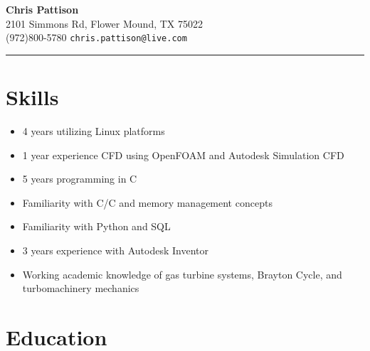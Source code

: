 \documentclass[11pt, letterpaper]{article}
\newcommand{\csharp}[0]{C\raisebox{.11em}{\footnotesize{\textbf{\#}}}}
\newcommand{\cpp}[0]{C\raisebox{.12em}{\footnotesize{\textbf{+\hspace{-.11em}+}}}}
\begin{document}
\begin{center}
\vspace{-2cm} \huge\textbf{Chris Pattison}\large\\
2101 Simmons Rd, Flower Mound, TX 75022\\
(972)800-5780 \textbf{\textbar} \texttt{chris.pattison@live.com}\normalsize

\rule{\textwidth}{1.5pt}\vspace{-1.2em}
\end{center}
\section*{Skills}
\begin{itemize}
\item 4 years utilizing Linux platforms
\item 1 year experience CFD using OpenFOAM and Autodesk Simulation CFD
\item 5 years programming in \csharp
\item Familiarity with C/\cpp{} and memory management concepts
\item Familiarity with Python and SQL
\item 3 years experience with Autodesk Inventor
\item Working academic knowledge of gas turbine systems, Brayton Cycle, and turbomachinery mechanics
\end{itemize}

\section*{Education}
\end{document}
